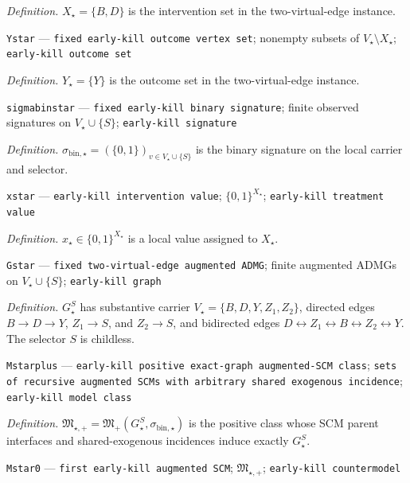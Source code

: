 \documentclass{article}
\begin{document}
\begin{itemize}
{{{{  \par\smallskip\noindent\emph{Definition.} \(X_\star=\{B,D\}\) is the intervention set in the two-virtual-edge instance.
  \item \texttt{Ystar} --- \texttt{fixed early-\allowbreak{}kill outcome vertex set}; nonempty subsets of \(V_\star\setminus X_\star\); \texttt{early-\allowbreak{}kill outcome set}
  \par\smallskip\noindent\emph{Definition.} \(Y_\star=\{Y\}\) is the outcome set in the two-virtual-edge instance.
  \item \texttt{sigmabinstar} --- \texttt{fixed early-\allowbreak{}kill binary signature}; finite observed signatures on \(V_\star\cup\{S\}\); \texttt{early-\allowbreak{}kill signature}
  \par\smallskip\noindent\emph{Definition.} \(\sigma_{\mathrm{bin},\star}=(\{0,1\})_{v\in V_\star\cup\{S\}}\) is the binary signature on the local carrier and selector.
  \item \texttt{xstar} --- \texttt{early-\allowbreak{}kill intervention value}; \(\{0,1\}^{X_\star}\); \texttt{early-\allowbreak{}kill treatment value}
  \par\smallskip\noindent\emph{Definition.} \(x_\star\in\{0,1\}^{X_\star}\) is a local value assigned to \(X_\star\).
  \item \texttt{Gstar} --- \texttt{fixed two-\allowbreak{}virtual-\allowbreak{}edge augmented ADMG}; finite augmented ADMGs on \(V_\star\cup\{S\}\); \texttt{early-\allowbreak{}kill graph}
  \par\smallskip\noindent\emph{Definition.} \(G_\star^S\) has substantive carrier \(V_\star=\{B,D,Y,Z_1,Z_2\}\), directed edges \(B\to D\to Y\), \(Z_1\to S\), and \(Z_2\to S\), and bidirected edges \(D\leftrightarrow Z_1\leftrightarrow B\leftrightarrow Z_2\leftrightarrow Y\). The selector \(S\) is childless.
  \item \texttt{Mstarplus} --- \texttt{early-\allowbreak{}kill positive exact-\allowbreak{}graph augmented-\allowbreak{}SCM class}; \texttt{sets of recursive augmented SCMs with arbitrary shared exogenous incidence}; \texttt{early-\allowbreak{}kill model class}
  \par\smallskip\noindent\emph{Definition.} \(\mathfrak M_{\star,+}=\mathfrak M_+(G_\star^S,\sigma_{\mathrm{bin},\star})\) is the positive class whose SCM parent interfaces and shared-exogenous incidences induce exactly \(G_\star^S\).
  \item \texttt{Mstar0} --- \texttt{first early-\allowbreak{}kill augmented SCM}; \(\mathfrak M_{\star,+}\); \texttt{early-\allowbreak{}kill countermodel}
}}}}
\end{itemize}
\end{document}
